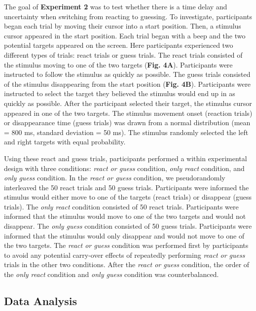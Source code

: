 \documentclass[man,donotrepeattitle,floatsintext,letterpaper,12pt]{apa7}
\newcommand\boldblue[1]{\textcolor{mydarkblue}{\textbf{#1}}}
\begin{document}
\noindent The goal of \boldblue{Experiment 2} was to test whether there is a time delay and uncertainty when switching from reacting to guessing. To investigate, participants began each trial by moving their cursor into a start position. Then, a stimulus cursor appeared in the start position. Each trial began with a beep and the two potential targets appeared on the screen. Here participants experienced two different types of trials: react trials or guess trials. The react trials consisted of the stimulus moving to one of the two targets (\boldblue{Fig. 4A}). Participants were instructed to follow the stimulus as quickly as possible. The guess trials consisted of the stimulus disappearing from the start position (\boldblue{Fig. 4B}). Participants were instructed to select the target they believed the stimulus would end up in as quickly as possible. After the participant selected their target, the stimulus cursor appeared in one of the two targets. The stimulus movement onset (reaction trials) or disappearance time (guess trials) was drawn from a normal distribution (mean = 800 ms, standard deviation = 50 ms).  The stimulus randomly selected the left and right targets with equal probability.

Using these react and guess trials, participants performed a within experimental design with three conditions: \emph{react or guess} condition, \emph{only react} condition, and \emph{only guess} condition. In the \emph{react or guess} condition, we pseudorandomly interleaved the 50 react trials and 50 guess trials. Participants were informed the stimulus would either move to one of the targets (react trials) or disappear (guess trials). The \emph{only react} condition consisted of 50 react trials. Participants were informed that the stimulus would move to one of the two targets and would not disappear. The \emph{only guess} condition consisted of 50 guess trials. Participants were informed that the stimulus would only disappear and would not move to one of the two targets. The \emph{react or guess} condition was performed first by participants to avoid any potential carry-over effects of repeatedly performing \emph{react or guess} trials in the other two conditions. After the \emph{react or guess} condition, the order of the \emph{only react} condition and \emph{only guess} condition was counterbalanced.

\subsection{Data Analysis}
\end{document}
